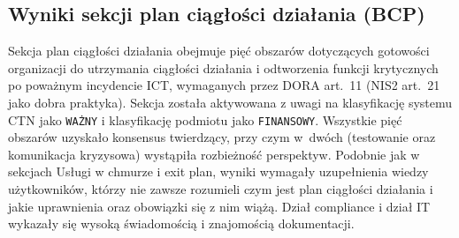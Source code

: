 \subsection{Wyniki sekcji plan ciągłości działania (BCP)}

Sekcja plan ciągłości działania obejmuje pięć obszarów dotyczących gotowości organizacji do utrzymania ciągłości działania i odtworzenia funkcji krytycznych po poważnym incydencie ICT, wymaganych przez DORA art.~11 (NIS2 art.~21 jako dobra praktyka). Sekcja została aktywowana z uwagi na klasyfikację systemu CTN jako \texttt{WAŻNY} i klasyfikację podmiotu jako \texttt{FINANSOWY}. Wszystkie pięć obszarów uzyskało konsensus twierdzący, przy czym w~dwóch (testowanie oraz komunikacja kryzysowa) wystąpiła rozbieżność perspektyw. Podobnie jak w sekcjach Usługi w chmurze i exit plan, wyniki wymagały uzupełnienia wiedzy użytkowników, którzy nie zawsze rozumieli czym jest plan ciągłości działania i jakie uprawnienia oraz obowiązki się z nim wiążą. Dział compliance i dział IT wykazały się wysoką świadomością i znajomością dokumentacji.

